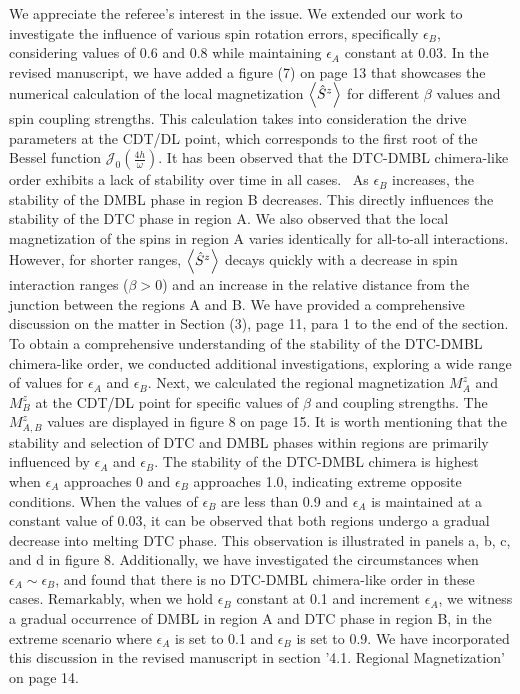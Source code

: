 \documentclass[aps,prb,reprint,showpacs,floatfix,superscriptaddress, onecolumn, nofootinbib, 10pt]{revtex4-2}
\newcommand{\response}[1]{{\color{black}#1}} %
\begin{document}
\begin{enumerate}
\begin{enumerate}
		\response{We appreciate the referee's interest in the issue. We extended our work to investigate the influence of various spin rotation errors, specifically $\epsilon_B$, considering values of 0.6 and 0.8 while maintaining $\epsilon_A$ constant at 0.03. In the revised manuscript, we have added a figure (7) on page 13 that showcases the numerical calculation of the local magnetization $\expval{\hat{S}^z}$ for different $\beta$ values and spin coupling strengths. This calculation takes into consideration the drive parameters at the CDT/DL point, which corresponds to the first root of the Bessel function $\mathcal{J}_0\left(\frac{4h}{\omega}\right)$. It has been observed that the DTC-DMBL chimera-like order exhibits a lack of stability over time in all cases.  As $\epsilon_B$ increases, the stability of the DMBL phase in region B decreases. This directly influences the stability of the DTC phase in region A. We also observed that the local magnetization of the spins in region A varies identically for all-to-all interactions. However, for shorter ranges, $\expval{\hat{S}^z}$ decays quickly with a decrease in spin interaction ranges ($\beta >0$) and an increase in the relative distance from the junction between the regions A and B. We have provided a comprehensive discussion on the matter in Section (3), page 11, para 1 to the end of the section.\\
			
		To obtain a comprehensive understanding of the stability of the DTC-DMBL chimera-like order, we conducted additional investigations, exploring a wide range of values for $\epsilon_A$ and $\epsilon_B$. Next, we calculated the regional magnetization $M^z_A$ and $M^z_B$ at the CDT/DL point for specific values of $\beta$ and coupling strengths. The $M^z_{A,B}$ values are displayed in figure 8 on page 15. It is worth mentioning that the stability and selection of DTC and DMBL phases within regions are primarily influenced by $\epsilon_A$ and $\epsilon_B$. The stability of the DTC-DMBL chimera is highest when $\epsilon_A$ approaches 0 and $\epsilon_B$ approaches 1.0, indicating extreme opposite conditions. When the values of $\epsilon_B$ are less than 0.9 and $\epsilon_A$ is maintained at a constant value of 0.03, it can be observed that both regions undergo a gradual decrease into melting DTC phase. This observation is illustrated in panels a, b, c, and d in figure 8. Additionally, we have investigated the circumstances when $\epsilon_A\sim\epsilon_B$, and found that there is no DTC-DMBL chimera-like order in these cases. Remarkably, when we hold $\epsilon_B$ constant at 0.1 and increment $\epsilon_A$, we witness a gradual occurrence of DMBL in region A and DTC phase in region B, in the extreme scenario where $\epsilon_A$ is set to 0.1 and $\epsilon_B$ is set to 0.9. We have incorporated this discussion in the revised manuscript in section '4.1. Regional Magnetization' on page 14.		
		}
	

\end{enumerate}
\end{enumerate}
\end{document}
